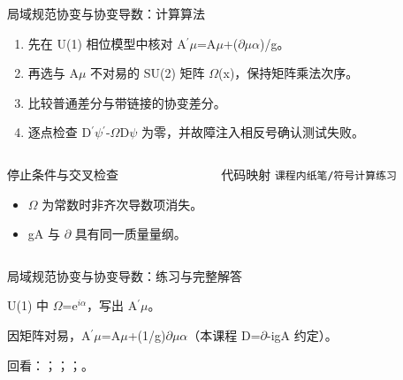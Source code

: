\begin{frame}[t]{局域规范协变与协变导数：计算算法}
\footnotesize
{}\begin{enumerate}
\item 先在 U(1) 相位模型中核对 A\ensuremath{^{\prime}}\ensuremath{\mu}=A\ensuremath{\mu}+(\ensuremath{\partial}\ensuremath{\mu}\ensuremath{\alpha})/\allowbreak{}g。
\item 再选与 A\ensuremath{\mu} 不对易的 SU(2) 矩阵 \ensuremath{\Omega}(x)，保持矩阵乘法次序。
\item 比较普通差分与带链接的协变差分。
\item 逐点检查 D\ensuremath{^{\prime}}\ensuremath{\psi}\ensuremath{^{\prime}}-\ensuremath{\Omega}D\ensuremath{\psi} 为零，并故障注入相反号确认测试失败。
\end{enumerate}\begin{columns}[T,onlytextwidth]
\begin{block}{停止条件与交叉检查}\scriptsize\begin{itemize}
\item[\CheckMark] \ensuremath{\Omega} 为常数时非齐次导数项消失。
\item[\CheckMark] gA 与 \ensuremath{\partial} 具有同一质量量纲。
\end{itemize}\end{block}
\begin{block}{代码映射}
\scriptsize \texttt{课程内纸笔/\allowbreak{}符号计算练习}
\end{block}\end{columns}\end{frame}

\begin{frame}[t]{局域规范协变与协变导数：练习与完整解答}
\footnotesize
\begin{block}{}U(1) 中 \ensuremath{\Omega}=e\ensuremath{^{i\alpha}}，写出 A\ensuremath{^{\prime}}\ensuremath{\mu}。\end{block}
\begin{exampleblock}{}因矩阵对易，A\ensuremath{^{\prime}}\ensuremath{\mu}=A\ensuremath{\mu}+(1/\allowbreak{}g)\ensuremath{\partial}\ensuremath{\mu}\ensuremath{\alpha}（本课程 D=\ensuremath{\partial}-igA 约定）。\end{exampleblock}
\vfill
\scriptsize 回看：；；；。
\end{frame}

